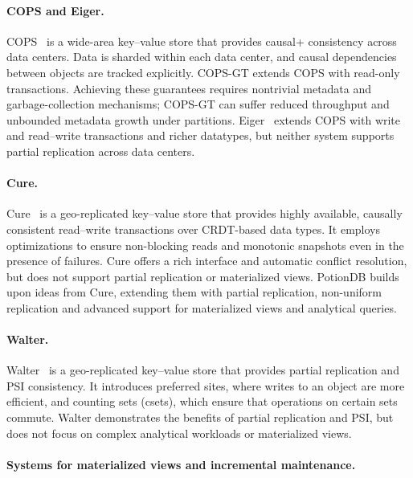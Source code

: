 \paragraph{COPS and Eiger.}

COPS~\cite{cops} is a wide-area key–value store that provides causal+ consistency
across data centers. Data is sharded within each data center, and causal
dependencies between objects are tracked explicitly. COPS-GT extends COPS with
read-only transactions. Achieving these guarantees requires nontrivial metadata
and garbage-collection mechanisms; COPS-GT can suffer reduced throughput and
unbounded metadata growth under partitions. Eiger~\cite{eiger} extends COPS with
write and read–write transactions and richer datatypes, but neither system
supports partial replication across data centers.

\paragraph{Cure.}

Cure~\cite{cure} is a geo-replicated key–value store that provides highly
available, causally consistent read–write transactions over CRDT-based data
types. It employs optimizations to ensure non-blocking reads and monotonic
snapshots even in the presence of failures. Cure offers a rich interface and
automatic conflict resolution, but does not support partial replication or
materialized views. PotionDB builds upon ideas from Cure, extending them with
partial replication, non-uniform replication and advanced support for
materialized views and analytical queries.

\paragraph{Walter.}

Walter~\cite{walter} is a geo-replicated key–value store that provides partial
replication and PSI consistency. It introduces preferred sites, where writes to
an object are more efficient, and counting sets (csets), which ensure that
operations on certain sets commute. Walter demonstrates the benefits of partial
replication and PSI, but does not focus on complex analytical workloads or
materialized views.

\paragraph{Systems for materialized views and incremental maintenance.}

